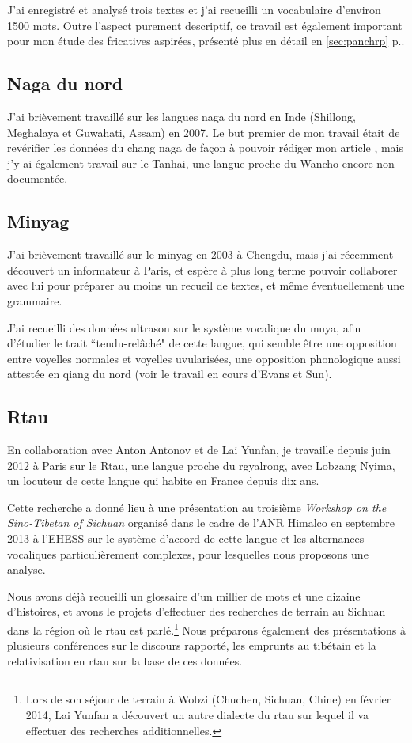 \documentclass[oldfontcommands,oneside,a4paper,11pt]{memoir}
\begin{document}
J'ai enregistré et analysé trois textes et j'ai recueilli un vocabulaire d'environ 1500 mots.  Outre l'aspect purement descriptif, ce travail est également important pour mon étude des fricatives aspirées, présenté plus en détail en \ref{sec:panchrp} p.\pageref{sec:panchrp}.

\subsection{Naga du nord}
J'ai brièvement travaillé sur les langues naga du nord en Inde (Shillong, Meghalaya et Guwahati, Assam) en 2007. Le but premier de mon travail était de revérifier les données du chang naga de façon à pouvoir rédiger mon article \citet{jacques07chang}, mais j'y ai également travail sur le Tanhai, une langue proche du Wancho encore non documentée. 


\subsection{Minyag}
J'ai brièvement travaillé sur le minyag en 2003 à Chengdu, mais j'ai récemment découvert un informateur à Paris, et espère à plus long terme pouvoir collaborer avec lui pour préparer au moins un recueil de textes, et même éventuellement une grammaire.

J'ai recueilli des données ultrason sur le système vocalique du muya, afin d'étudier le trait ``tendu-relâché" de cette langue, qui semble être une opposition entre voyelles normales et voyelles uvularisées, une opposition phonologique aussi attestée en qiang du nord (voir le travail en cours d'Evans et Sun).

\subsection{Rtau}
En collaboration avec Anton Antonov et de Lai Yunfan, je travaille depuis juin 2012 à Paris sur le Rtau, une langue proche du rgyalrong, avec Lobzang Nyima, un  locuteur de cette langue qui habite en France depuis dix ans. 

Cette recherche a donné lieu à une présentation au troisième \textit{Workshop on the Sino-Tibetan of Sichuan} organisé dans le cadre de l'ANR Himalco en septembre 2013 à l'EHESS sur le système d'accord de cette langue et les alternances vocaliques particulièrement complexes, pour lesquelles nous proposons une analyse.

Nous avons déjà recueilli un glossaire d'un millier de mots et une dizaine d'histoires, et avons le projets d'effectuer des recherches de terrain au Sichuan dans la région où le rtau est parlé.\footnote{Lors de son séjour de terrain à Wobzi (Chuchen, Sichuan, Chine) en février 2014, Lai Yunfan a découvert un autre dialecte du rtau sur lequel il va effectuer des recherches additionnelles.} Nous préparons également des présentations à plusieurs conférences sur le discours rapporté, les emprunts au tibétain et la relativisation en rtau sur la base de ces données.
\end{document}

